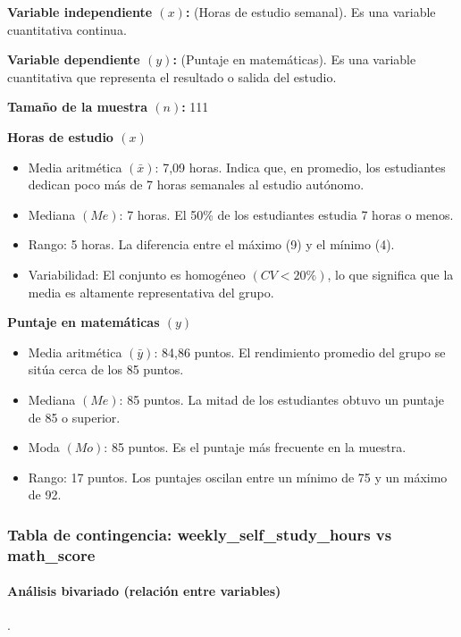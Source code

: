 \textbf{Variable independiente $(x)$:}  (Horas de estudio semanal). Es una variable cuantitativa continua.

\textbf{Variable dependiente $(y)$:}  (Puntaje en matemáticas). Es una variable cuantitativa que representa el resultado o salida del estudio.

\textbf{Tamaño de la muestra $(n)$:} 111

\textbf{Horas de estudio $(x)$}
\begin{itemize}
\item Media aritmética $(\bar{x})$: 7,09 horas. Indica que, en promedio, los estudiantes dedican poco más de 7 horas semanales al estudio autónomo.
\item Mediana $(Me)$: 7 horas. El 50\% de los estudiantes estudia 7 horas o menos.
\item Rango: 5 horas. La diferencia entre el máximo (9) y el mínimo (4).
\item Variabilidad: El conjunto es homogéneo $(CV<20\%)$, lo que significa que la media es altamente representativa del grupo.
\end{itemize}

\textbf{Puntaje en matemáticas $(y)$}
\begin{itemize}
\item Media aritmética $(\bar{y})$: 84,86 puntos. El rendimiento promedio del grupo se sitúa cerca de los 85 puntos.
\item Mediana $(Me)$: 85 puntos. La mitad de los estudiantes obtuvo un puntaje de 85 o superior.
\item Moda $(Mo)$: 85 puntos. Es el puntaje más frecuente en la muestra.
\item Rango: 17 puntos. Los puntajes oscilan entre un mínimo de 75 y un máximo de 92.
\end{itemize}
\newpage
\subsubsection{Tabla de contingencia: weekly\_self\_study\_hours vs math\_score}





\paragraph{Análisis bivariado (relación entre variables)}.


